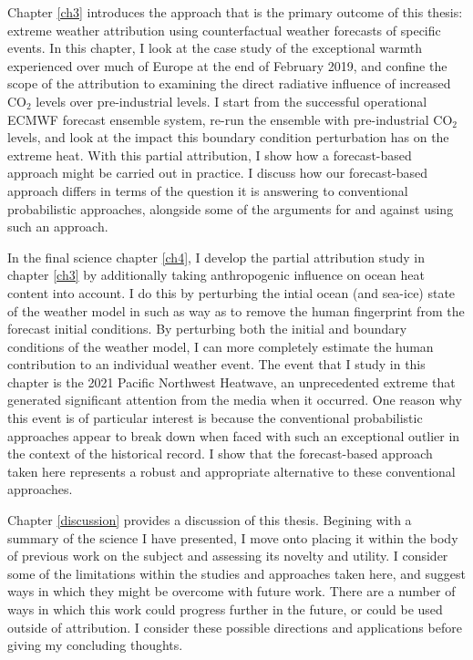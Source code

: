   Chapter \ref{ch3} introduces the approach that is the primary outcome of this thesis: extreme weather attribution using counterfactual weather forecasts of specific events. In this chapter, I look at the case study of the exceptional warmth experienced over much of Europe at the end of February 2019, and confine the scope of the attribution to examining the direct radiative influence of increased CO$_2$ levels over pre-industrial levels. I start from the successful operational ECMWF forecast ensemble system, re-run the ensemble with pre-industrial CO$_2$ levels, and look at the impact this boundary condition perturbation has on the extreme heat. With this partial attribution, I show how a forecast-based approach might be carried out in practice. I discuss how our forecast-based approach differs in terms of the question it is answering to conventional probabilistic approaches, alongside some of the arguments for and against using such an approach.

  In the final science chapter \ref{ch4}, I develop the partial attribution study in chapter \ref{ch3} by additionally taking anthropogenic influence on ocean heat content into account. I do this by perturbing the intial ocean (and sea-ice) state of the weather model in such as way as to remove the human fingerprint from the forecast initial conditions. By perturbing both the initial and boundary conditions of the weather model, I can more completely estimate the human contribution to an individual weather event. The event that I study in this chapter is the 2021 Pacific Northwest Heatwave, an unprecedented extreme that generated significant attention from the media when it occurred. One reason why this event is of particular interest is because the conventional probabilistic approaches appear to break down when faced with such an exceptional outlier in the context of the historical record. I show that the forecast-based approach taken here represents a robust and appropriate alternative to these conventional approaches.

  Chapter \ref{discussion} provides a discussion of this thesis. Begining with a summary of the science I have presented, I move onto placing it within the body of previous work on the subject and assessing its novelty and utility. I consider some of the limitations within the studies and approaches taken here, and suggest ways in which they might be overcome with future work. There are a number of ways in which this work could progress further in the future, or could be used outside of attribution. I consider these possible directions and applications before giving my concluding thoughts.
